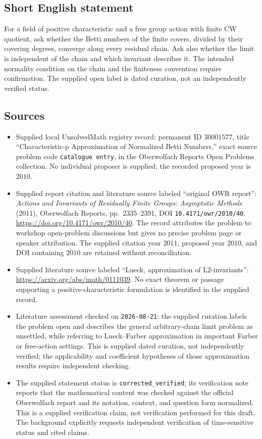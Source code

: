 \documentclass[11pt]{article}
\begin{document}
\subsection{Short English statement}
For a field of positive characteristic and a free group action with finite CW quotient, ask whether the Betti numbers of the finite covers, divided by their covering degrees, converge along every residual chain. Ask also whether the limit is independent of the chain and which invariant describes it. The intended normality condition on the chain and the finiteness convention require confirmation. The supplied open label is dated curation, not an independently verified status.
\subsection{Sources}
\begin{itemize}
\item Supplied local UnsolvedMath registry record: permanent ID \(30001577\), title ``Characteristic-p Approximation of Normalized Betti Numbers,'' exact source problem code \texttt{catalogue entry}, in the Oberwolfach Reports Open Problems collection. No individual proposer is supplied; the recorded proposed year is \(2010\).
\item Supplied report citation and literature source labeled ``original OWR report'': \emph{Actions and Invariants of Residually Finite Groups: Asymptotic Methods} (2011), Oberwolfach Reports, pp.~2335--2391, DOI \texttt{10.4171/owr/2010/40}. \url{https://doi.org/10.4171/owr/2010/40}. The record attributes the problem to workshop open-problem discussions but gives no precise problem page or speaker attribution. The supplied citation year \(2011\), proposed year \(2010\), and DOI containing \(2010\) are retained without reconciliation.
\item Supplied literature source labeled ``Lueck, approximation of L2-invariants'': \url{https://arxiv.org/abs/math/0111039}. No exact theorem or passage supporting a positive-characteristic formulation is identified in the supplied record.
\item Literature assessment checked on \texttt{2026-08-21}: the supplied curation labels the problem open and describes the general arbitrary-chain limit problem as unsettled, while referring to Lueck--Farber approximation in important Farber or free-action settings. This is supplied dated curation, not independently verified; the applicability and coefficient hypotheses of those approximation results require independent checking.
\item The supplied statement status is \texttt{corrected\_verified}; its verification note reports that the mathematical content was checked against the official Oberwolfach report and its notation, context, and question form normalized. This is a supplied verification claim, not verification performed for this draft. The background explicitly requests independent verification of time-sensitive status and cited claims.
\end{itemize}
\end{document}
